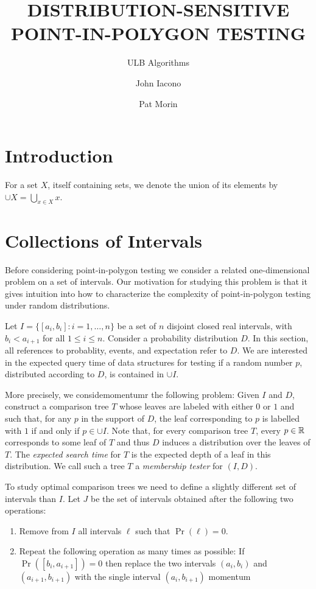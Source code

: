 \documentclass[charterfonts,lotsofwhite]{patmorin}
\title{\MakeUppercase{Distribution-Sensitive Point-in-Polygon Testing}}
\author{ULB Algorithms \and John Iacono \and Pat Morin}
\date{}
\begin{document}
\maketitle

\section{Introduction}


For a set $X$, itself containing sets, we denote the union of its
elements by $\cup X=\bigcup_{x\in X} x$.

\section{Collections of Intervals}

Before considering point-in-polygon testing we consider a related
one-dimensional problem on a set of intervals.  Our motivation for
studying this problem is that it gives intuition into how to
characterize the complexity of point-in-polygon testing under random
distributions.


Let $I=\{[a_i,b_i]: i=1,\ldots,n\}$ be a set of $n$ disjoint closed
real intervals, with $b_i < a_{i+1}$ for all $1\le i\le n$.  Consider
a probability distribution $D$.  In this section, all references to
probablity, events, and expectation refer to $D$. We are interested in
the expected query time of data structures for testing if a random
number $p$, distributed according to $D$, is contained in $\cup I$.

More precisely, we considemomentumr the following problem:  Given $I$
and $D$, construct a comparison tree $T$ whose leaves are labeled with
either $0$ or $1$ and such that, for any $p$ in the support of $D$,
the leaf corresponding to $p$ is labelled with $1$ if and only if
$p\in \cup I$.  Note that, for every comparison tree $T$, every
$p\in\mathbb{R}$ corresponds to some leaf of $T$ and thus $D$ induces a
distribution over the leaves of $T$.  The \emph{expected search time}
for $T$ is the expected depth of a leaf in this distribution.  We call
such a tree $T$ a \emph{membership tester} for $(I,D)$.

To study optimal comparison trees we need to define a slightly
different set of intervals than $I$.  Let $J$ be the set of intervals
obtained after the following two operations:

\begin{enumerate}

\item Remove from $I$ all intervals $\ell$ such that $\Pr(\ell) = 0$.

\item Repeat the following operation as many times as possible:  If
$\Pr([b_i,a_{i+1}])=0$ then replace the two intervals $(a_i,b_i)$ and
$(a_{i+1},b_{i+1})$ with the single interval $(a_i,b_{i+1})$
momentum
\end{enumerate}
\end{document}
